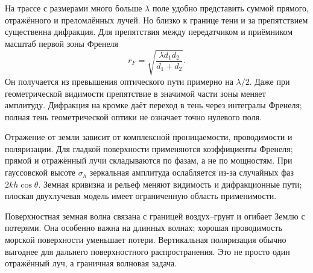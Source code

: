 
На трассе с размерами много больше $\lambda$ поле удобно представить суммой прямого, отражённого и преломлённых лучей. Но близко к границе тени и за препятствием существенна дифракция. Для препятствия между передатчиком и приёмником масштаб первой зоны Френеля
\begin{equation}
 r_F=\sqrt{\frac{\lambda d_1d_2}{d_1+d_2}}.
\end{equation}
Он получается из превышения оптического пути примерно на $\lambda/2$. Даже при геометрической видимости препятствие в значимой части зоны меняет амплитуду. Дифракция на кромке даёт переход в тень через интегралы Френеля; полная тень геометрической оптики не означает точно нулевого поля.

Отражение от земли зависит от комплексной проницаемости, проводимости и поляризации. Для гладкой поверхности применяются коэффициенты Френеля; прямой и отражённый лучи складываются по фазам, а не по мощностям. При гауссовской высоте $\sigma_h$ зеркальная амплитуда ослабляется из-за случайных фаз $2kh\cos\theta$. Земная кривизна и рельеф меняют видимость и дифракционные пути; плоская двухлучевая модель имеет ограниченную область применимости.

Поверхностная земная волна связана с границей воздух–грунт и огибает Землю с потерями. Она особенно важна на длинных волнах; хорошая проводимость морской поверхности уменьшает потери. Вертикальная поляризация обычно выгоднее для дальнего поверхностного распространения. Это не просто один отражённый луч, а граничная волновая задача.
